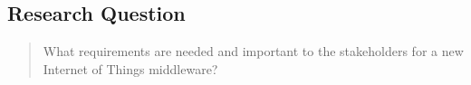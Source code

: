 \subsection{Research Question}
\begin{quotation}
What requirements are needed and important to the stakeholders for a new Internet of Things middleware?
\end{quotation}

